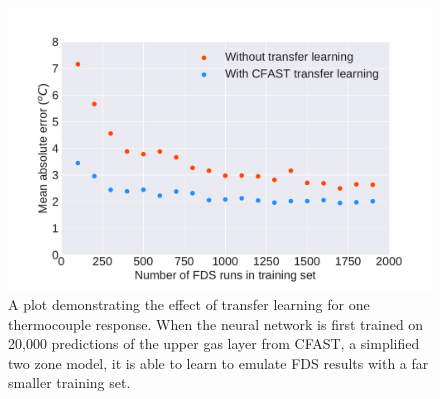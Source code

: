 \documentclass{article}
\begin{document}
\begin{figure}[htb] \centering
\includegraphics[width=.75\textwidth]{./figures/transfer_learning_effect.pdf}
\caption{A plot demonstrating the effect of transfer learning for one thermocouple response. When the neural network is first trained on 20,000 predictions of the upper gas layer from CFAST, a simplified two zone model, it is able to learn to emulate FDS results with a far smaller training set. }
\label{fig:transfer_learning}
\end{figure}
\end{document}
